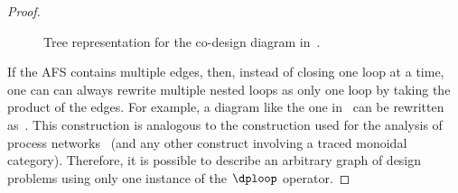 \begin{proof}
\begin{figure}[H]
\caption{Tree representation for the co-design diagram in~.}
\end{figure}

If the AFS contains multiple edges, then, instead of closing one loop
at a time, one can can always rewrite multiple nested loops as only
one loop by taking the product of the edges. For example, a diagram
like the one in~ can be rewritten as~.
This construction is analogous to the construction used for the analysis
of process networks~\cite{lee10} (and any other construct involving
a traced monoidal category). Therefore, it is possible to describe
an arbitrary graph of design problems using only one instance of the
$\dploop$ operator.
\end{proof}

\begin{figure}[H]


\end{figure}
